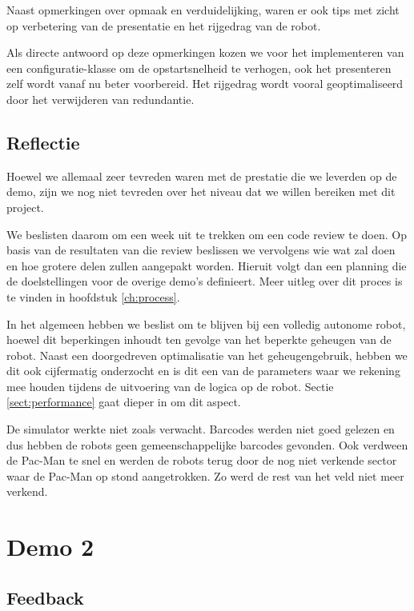 \documentclass[12pt,a4paper]{report}
\begin{document}
Naast opmerkingen over opmaak en verduidelijking, waren er ook tips met zicht op verbetering van de presentatie en het rijgedrag van de robot.

Als directe antwoord op deze opmerkingen kozen we voor het implementeren van een configuratie-klasse om de opstartsnelheid te verhogen, ook het presenteren zelf wordt vanaf nu beter voorbereid. Het rijgedrag wordt vooral geoptimaliseerd door het verwijderen van redundantie.

\subsection{Reflectie}

Hoewel we allemaal zeer tevreden waren met de prestatie die we leverden op de demo, zijn we nog niet tevreden over het niveau dat we willen bereiken met dit project.

We beslisten daarom om een week uit te trekken om een code review te doen. Op basis van de resultaten van die review beslissen we vervolgens wie wat zal doen en hoe grotere delen zullen aangepakt worden. Hieruit volgt dan een planning die de doelstellingen voor de overige demo's definieert. Meer uitleg over dit proces is te vinden in hoofdstuk \ref{ch:process}.

In het algemeen hebben we beslist om te blijven bij een volledig autonome robot, hoewel dit beperkingen inhoudt ten gevolge van het beperkte geheugen van de robot. Naast een doorgedreven optimalisatie van het geheugengebruik, hebben we dit ook cijfermatig onderzocht en is dit een van de parameters waar we rekening mee houden tijdens de uitvoering van de logica op de robot. Sectie \ref{sect:performance} gaat dieper in om dit aspect.

De simulator werkte niet zoals verwacht. Barcodes werden niet goed gelezen en dus hebben de robots geen gemeenschappelijke barcodes gevonden. Ook verdween de Pac-Man te snel en werden de robots terug door de nog niet verkende sector waar de Pac-Man op stond aangetrokken. Zo werd de rest van het veld niet meer verkend.

\section{Demo 2}

\subsection{Feedback}
\end{document}
